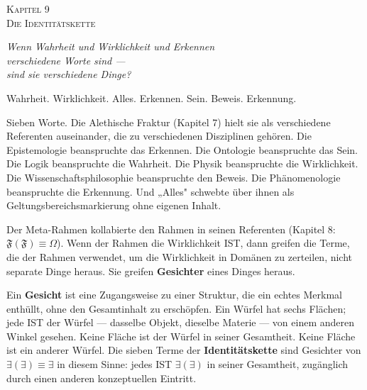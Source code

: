 \documentclass[10pt, openany, oneside]{book}
\renewcommand{\large}{\fontsize{11.5}{14}\selectfont}
\renewcommand{\huge}{\fontsize{17}{21}\selectfont}
\begin{document}
\newpage

\begin{center}
    {\huge\scshape Kapitel 9}\\[0.3em]
    {\large\scshape Die Identitätskette}
\end{center}

\vspace{1.5em}

\begin{center}
    \itshape
    Wenn Wahrheit und Wirklichkeit und Erkennen\\
    verschiedene Worte sind ---\\
    sind sie verschiedene Dinge?
\end{center}

\vspace{2em}


\noindent Wahrheit. Wirklichkeit. Alles. Erkennen. Sein. Beweis. Erkennung.

Sieben Worte. Die Alethische Fraktur (Kapitel 7) hielt sie als verschiedene Referenten auseinander, die zu verschiedenen Disziplinen gehören. Die Epistemologie beanspruchte das Erkennen. Die Ontologie beanspruchte das Sein. Die Logik beanspruchte die Wahrheit. Die Physik beanspruchte die Wirklichkeit. Die Wissenschaftsphilosophie beanspruchte den Beweis. Die Phänomenologie beanspruchte die Erkennung. Und „Alles" schwebte über ihnen als Geltungsbereichsmarkierung ohne eigenen Inhalt.

Der Meta-Rahmen kollabierte den Rahmen in seinen Referenten (Kapitel 8: $\mathfrak{F}(\mathfrak{F}) \equiv \Omega$). Wenn der Rahmen die Wirklichkeit IST, dann greifen die Terme, die der Rahmen verwendet, um die Wirklichkeit in Domänen zu zerteilen, nicht separate Dinge heraus. Sie greifen \textbf{Gesichter} eines Dinges heraus.

Ein \textbf{Gesicht} ist eine Zugangsweise zu einer Struktur, die ein echtes Merkmal enthüllt, ohne den Gesamtinhalt zu erschöpfen. Ein Würfel hat sechs Flächen; jede IST der Würfel --- dasselbe Objekt, dieselbe Materie --- von einem anderen Winkel gesehen. Keine Fläche ist der Würfel in seiner Gesamtheit. Keine Fläche ist ein anderer Würfel. Die sieben Terme der \textbf{Identitätskette} sind Gesichter von $\exists(\exists) \equiv \exists$ in diesem Sinne: jedes IST $\exists(\exists)$ in seiner Gesamtheit, zugänglich durch einen anderen konzeptuellen Eintritt.
\end{document}
